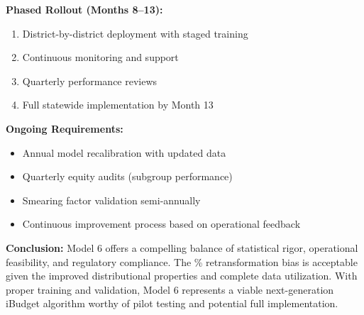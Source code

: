 \textbf{Phased Rollout (Months 8--13):}
\begin{enumerate}
    \item District-by-district deployment with staged training
    \item Continuous monitoring and support
    \item Quarterly performance reviews
    \item Full statewide implementation by Month 13
\end{enumerate}

\textbf{Ongoing Requirements:}
\begin{itemize}
    \item Annual model recalibration with updated data
    \item Quarterly equity audits (subgroup performance)
    \item Smearing factor validation semi-annually
    \item Continuous improvement process based on operational feedback
\end{itemize}

\vspace{1cm}

\noindent\textbf{Conclusion:} Model 6 offers a compelling balance of statistical rigor, operational feasibility, and regulatory compliance. The \ModelSixSmearingBias{}\% retransformation bias is acceptable given the improved distributional properties and complete data utilization. With proper training and validation, Model 6 represents a viable next-generation iBudget algorithm worthy of pilot testing and potential full implementation.